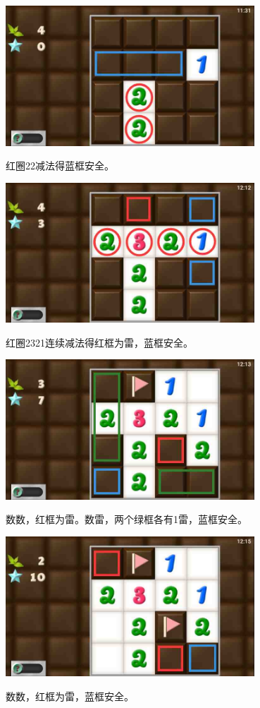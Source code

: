 \subsection{} %
\begin{center}
    \includegraphics[width=0.7\textwidth]{puzzlelow/22-1.jpg}
\end{center}
红圈22减法得蓝框安全。
\begin{center}
    \includegraphics[width=0.7\textwidth]{puzzlelow/22-2.jpg}
\end{center}
红圈2321连续减法得红框为雷，蓝框安全。
\begin{center}
    \includegraphics[width=0.7\textwidth]{puzzlelow/22-3.jpg}
\end{center}
数数，红框为雷。数雷，两个绿框各有1雷，蓝框安全。
\begin{center}
    \includegraphics[width=0.7\textwidth]{puzzlelow/22-4.jpg}
\end{center}
数数，红框为雷，蓝框安全。

